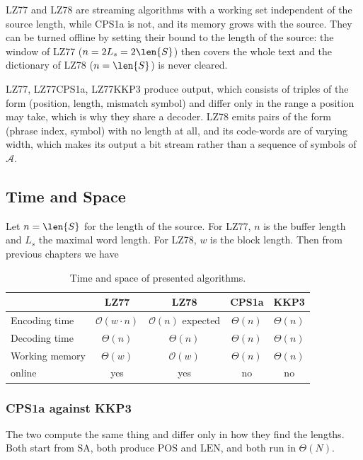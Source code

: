 LZ77 and LZ78 are streaming algorithms with a working set independent of the source length, while CPS1a is not, and its memory grows with the source. They can be turned offline by setting their bound to the length of the source: the window of LZ77 (\(n = 2L_s = 2\len{S}\)) then covers the whole text and the dictionary of LZ78 (\(n =\len{S}\)) is never cleared.

LZ77, LZ77CPS1a, LZ77KKP3 produce output, which consists of triples of the form (position, length, mismatch symbol) and differ only in the range a position may take, which is why they share a decoder. LZ78 emits pairs of the form (phrase index, symbol) with no length at all, and its code-words are of varying width, which makes its output a bit stream rather than a sequence of symbols of \(\mathcal{A}\). 

\subsection{Time and Space}

Let \(n = \len{S}\) for the length of the source. For LZ77, \(n\) is the buffer length and \(L_s\) the maximal word length. For LZ78, \(w\) is the block length. Then from previous chapters we have
\begin{table}[H]
    \centering
    \begin{tabular}{lcccc}
        \toprule
            & LZ77 & LZ78 & CPS1a & KKP3\\
        \midrule
        Encoding time   & \(\mathcal{O}(w\cdot n)\) & \(\mathcal{O}(n)\) expected & \(\Theta(n)\) &\(\Theta(n)\)\\
        Decoding time   & \(\Theta(n)\)        & \(\Theta(n)\)    & \(\Theta(n)\)  & \(\Theta(n)\)\\
        Working memory  & \(\Theta(w)\)             & \(\mathcal{O}(w)\)    & \(\Theta(n)\)  & \(\Theta(n)\)\\  
        online          & yes       & yes      & no    & no\\
        \bottomrule
    \end{tabular}
    \caption{Time and space of presented algorithms.}
    \label{tab:time-and-space}
\end{table}

\subsubsection{CPS1a against KKP3}

The two compute the same thing and differ only in how they find the lengths. Both start from \(\mathrm{SA}\), both produce \(\mathrm{POS}\) and \(\mathrm{LEN}\), and both run in \(\Theta(N)\).

